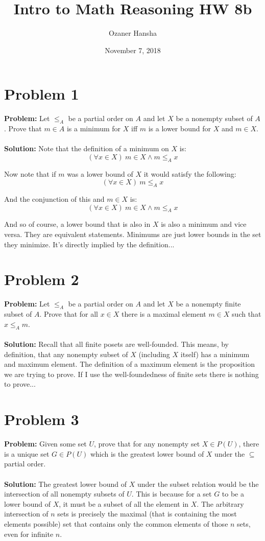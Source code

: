 \documentclass{article}
\begin{document}
\title{Intro to Math Reasoning HW 8b}
\author{Ozaner Hansha}
\date{November 7, 2018}
\maketitle

\section*{Problem 1}
\textbf{Problem:} Let $\le_A$ be a partial order on $A$ and let $X$ be a nonempty subset of $A$. Prove that $m\in A$ is a minimum for $X$ iff $m$ is a lower bound for $X$ and $m\in X$.
\\\\
\textbf{Solution:} Note that the definition of a minimum on $X$ is:
$$(\forall x\in X)\ m\in X\wedge m\le_Ax$$

Now note that if $m$ was a lower bound of $X$ it would satisfy the following:
$$(\forall x\in X)\ m\le_Ax$$

And the conjunction of this and $m\in X$ is:
$$(\forall x\in X)\ m\in X\wedge m\le_Ax$$

And so of course, a lower bound that is also in $X$ is also a minimum and vice versa. They are equivalent statements. Minimums are just lower bounds in the set they minimize. It's directly implied by the definition...

\section*{Problem 2}
\textbf{Problem:} Let $\le_A$ be a partial order on $A$ and let $X$ be a nonempty finite subset of $A$. Prove that for all $x\in X$ there is a maximal element $m\in X$ such that $x\le_Am$.
\\\\
\textbf{Solution:} Recall that all finite posets are well-founded. This means, by definition, that any nonempty subset of $X$ (including $X$ itself) has a minimum and maximum element. The definition of a maximum element is the proposition we are trying to prove. If I use the well-foundedness of finite sets there is nothing to prove...

\section*{Problem 3}
\textbf{Problem:} Given some set $U$, prove that for any nonempty set $X\in P(U)$, there is a unique set $G\in P(U)$ which is the greatest lower bound of $X$ under the $\subseteq$ partial order.
\\\\
\textbf{Solution:} The greatest lower bound of $X$ under the subset relation would be the intersection of all nonempty subsets of $U$. This is because for a set $G$ to be a lower bound of $X$, it must be a subset of all the element in $X$. The arbitrary intersection of $n$ sets is precisely the maximal (that is containing the most elements possible) set that contains only the common elements of those $n$ sets, even for infinite $n$.
\end{document}
